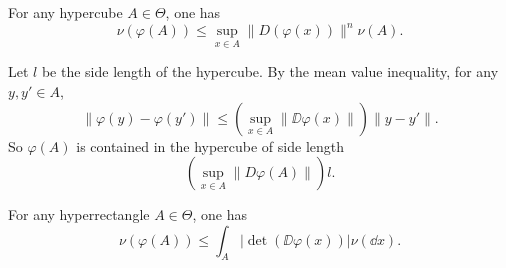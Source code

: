 \begin{lemmaenv}\label{lem:5.6.12}
    For any hypercube $A \in \Theta$, one has
    $$\nu\left(\varphi(A)\right) \le \sup_{x \in A} \|D(\varphi(x))\|^n \nu(A).$$
\end{lemmaenv}
\begin{proofenv}
    Let $l$ be the side length of the hypercube.
    By the mean value inequality,
    for any $y,y' \in A$,
    $$\|\varphi(y) - \varphi(y')\| \le (\sup_{x \in A}\|\DD \varphi(x)\|)\|y-y'\|.$$
    So $\varphi(A)$ is contained in the hypercube of side length
    $$\left(\sup_{x \in A}\|D\varphi(A)\|\right)l.$$
\end{proofenv}

\begin{lemmaenv}
    For any hyperrectangle $A \in \Theta$, one has
    $$\nu(\varphi(A)) \le \int_{A} |\det(\DD \varphi(x))| \nu(\dd x).$$
\end{lemmaenv}
